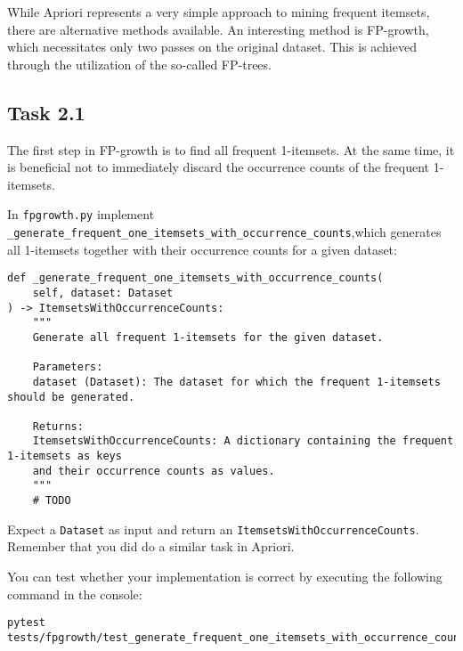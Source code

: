 \documentclass[
english,
smallborders
]{i6prcsht}
\begin{document}
While Apriori represents a very simple approach to mining frequent itemsets, there are alternative methods available. An interesting method is FP-growth, which necessitates only two passes on the original dataset. This is achieved through the utilization of the so-called FP-trees.

\subsection*{Task 2.1}

The first step in FP-growth is to find all frequent 1-itemsets. At the same time, it is beneficial not to immediately discard the occurrence counts of the frequent 1-itemsets.

In \texttt{fpgrowth.py} implement \texttt{\_generate\_frequent\_one\_itemsets\_with\_occurrence\_counts},\newline which generates all 1-itemsets together with their occurrence counts for a given dataset:

\vspace*{0.3cm}

\begin{lstlisting}
def _generate_frequent_one_itemsets_with_occurrence_counts(
	self, dataset: Dataset
) -> ItemsetsWithOccurrenceCounts:
	"""
	Generate all frequent 1-itemsets for the given dataset.

	Parameters:
	dataset (Dataset): The dataset for which the frequent 1-itemsets should be generated.

	Returns:
	ItemsetsWithOccurrenceCounts: A dictionary containing the frequent 1-itemsets as keys
	and their occurrence counts as values.
	"""
	# TODO
\end{lstlisting}

\vspace*{0.1cm}

Expect a \texttt{Dataset} as input and return an \texttt{ItemsetsWithOccurrenceCounts}. Remember that you did do a similar task in Apriori.

You can test whether your implementation is correct by executing the following command in the console:

\vspace*{0.3cm}

\begin{lstlisting}
pytest tests/fpgrowth/test_generate_frequent_one_itemsets_with_occurrence_counts.py
\end{lstlisting}

\vspace*{0.1cm}
\end{document}

